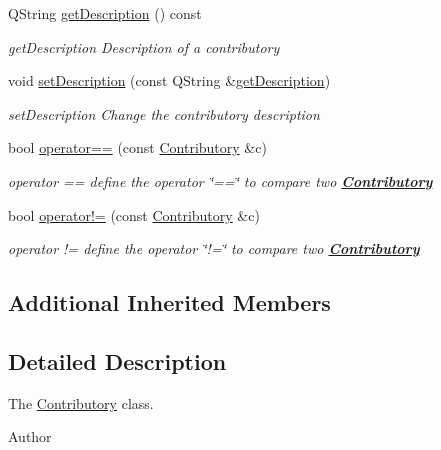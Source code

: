 \begin{DoxyCompactItemize}
Q\-String \hyperlink{classModels_1_1Contributory_ae2b936f2fb1ccad2009eae9b5d12fc02}{get\-Description} () const 
\begin{DoxyCompactList}\small\item\em get\-Description Description of a contributory \end{DoxyCompactList}\item 
void \hyperlink{classModels_1_1Contributory_a12d4199fa7175c0b43f62eddf7c3d69e}{set\-Description} (const Q\-String \&\hyperlink{classModels_1_1Contributory_ae2b936f2fb1ccad2009eae9b5d12fc02}{get\-Description})
\begin{DoxyCompactList}\small\item\em set\-Description Change the contributory description \end{DoxyCompactList}\item 
bool \hyperlink{classModels_1_1Contributory_ad49c8b9cdf7254069e07f2238b42c8f3}{operator==} (const \hyperlink{classModels_1_1Contributory}{Contributory} \&c)
\begin{DoxyCompactList}\small\item\em operator == define the operator \char`\"{}==\char`\"{} to compare two {\bfseries \hyperlink{classModels_1_1Contributory}{Contributory}} \end{DoxyCompactList}\item 
bool \hyperlink{classModels_1_1Contributory_a0808e6453b222f62d3288361dcb56d16}{operator!=} (const \hyperlink{classModels_1_1Contributory}{Contributory} \&c)
\begin{DoxyCompactList}\small\item\em operator != define the operator \char`\"{}!=\char`\"{} to compare two {\bfseries \hyperlink{classModels_1_1Contributory}{Contributory}} \end{DoxyCompactList}\end{DoxyCompactItemize}
\subsection*{Additional Inherited Members}


\subsection{Detailed Description}
The \hyperlink{classModels_1_1Contributory}{Contributory} class. 

\begin{DoxyAuthor}{Author}

\end{DoxyAuthor}


